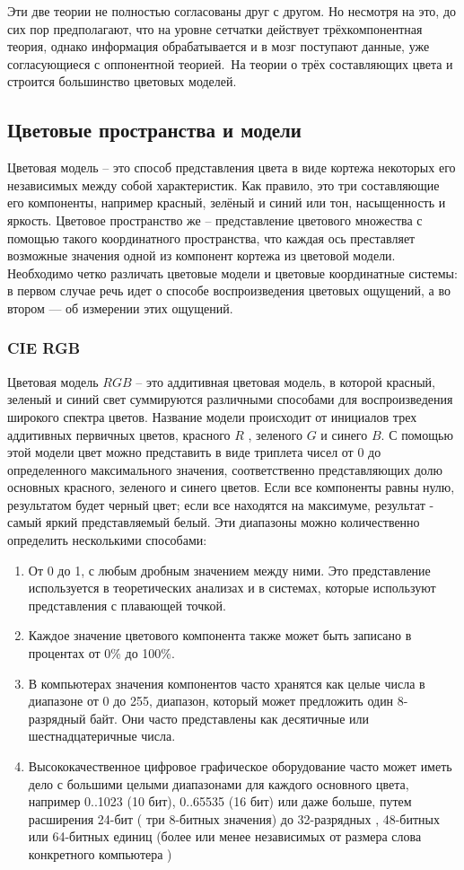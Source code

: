 Эти две теории не полностью согласованы друг с другом. Но несмотря на это, до сих пор предполагают, что на уровне сетчатки действует трёхкомпонентная теория, однако информация обрабатывается и в мозг поступают данные, уже согласующиеся с оппонентной теорией. На теории о трёх составляющих цвета и строится большинство цветовых моделей. 

\subsection {Цветовые пространства и модели}
Цветовая модель -- это способ представления цвета в виде кортежа некоторых его независимых между собой характеристик. Как правило, это три составляющие его компоненты, например красный, зелёный и синий или тон, насыщенность и яркость. Цветовое пространство же -- представление цветового множества с помощью такого координатного пространства, что каждая ось преставляет возможные значения одной из компонент кортежа из цветовой модели. Необходимо четко различать цветовые модели и цветовые координатные системы: в первом случае речь идет о способе воспроизведения цветовых ощущений, а во втором — об измерении этих ощущений.

\subsubsection{CIE RGB}
Цветовая модель $RGB$ -- это аддитивная цветовая модель, в которой красный, зеленый и синий свет суммируются различными способами для воспроизведения широкого спектра цветов. Название модели происходит от инициалов трех аддитивных первичных цветов, красного $R$ , зеленого $G$ и синего $B$.
С помощью этой модели цвет можно представить в виде триплета чисел от 0 до определенного максимального значения, соответственно представляющих долю основных красного, зеленого и синего цветов. Если все компоненты равны нулю, результатом будет черный цвет; если все находятся на максимуме, результат - самый яркий представляемый белый.
Эти диапазоны можно количественно определить несколькими способами:
\begin{enumerate}
	\item От 0 до 1, с любым дробным значением между ними. Это представление используется в теоретических анализах и в системах, которые используют представления с плавающей точкой.
	\item Каждое значение цветового компонента также может быть записано в процентах от 0\% до 100\%.
	\item В компьютерах значения компонентов часто хранятся как целые числа в диапазоне от 0 до 255, диапазон, который может предложить один 8-разрядный байт. Они часто представлены как десятичные или шестнадцатеричные числа.
	\item Высококачественное цифровое графическое оборудование часто может иметь дело с большими целыми диапазонами для каждого основного цвета, например 0..1023 (10 бит), 0..65535 (16 бит) или даже больше, путем расширения 24-бит ( три 8-битных значения) до 32-разрядных , 48-битных или 64-битных единиц (более или менее независимых от размера слова конкретного компьютера )
\end{enumerate}	

